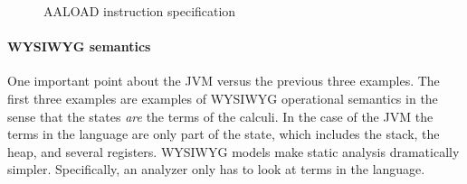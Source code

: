 \begin{figure}[h!]
  \caption{AALOAD instruction specification}
  \label{fig:AALOADSpec}
\end{figure}

\paragraph{WYSIWYG semantics}One important point about the JVM versus the previous three
examples. The first three examples are examples of WYSIWYG operational
semantics in the sense that the states \emph{are} the terms of the
calculi. In the case of the JVM the terms in the language are only
part of the state, which includes the stack, the heap, and several
registers. WYSIWYG models make static analysis dramatically
simpler. Specifically, an analyzer only has to look at terms in the
language.
